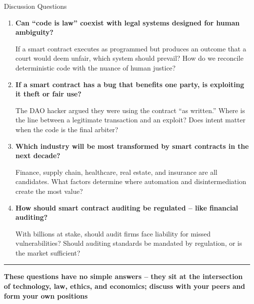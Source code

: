 \documentclass[8pt,aspectratio=169]{beamer}
\newcommand{\bottomnote}[1]{\vfill\vspace{-2mm}\textcolor{mllavender2}{\rule{\textwidth}{0.4pt}}\vspace{1mm}\footnotesize\textbf{#1}}
\begin{document}
\begin{frame}{Discussion Questions}
\begin{enumerate}
\item \textcolor{mlblue}{\textbf{Can ``code is law'' coexist with legal systems designed for human ambiguity?}}

\footnotesize If a smart contract executes as programmed but produces an outcome that a court would deem unfair, which system should prevail? How do we reconcile deterministic code with the nuance of human justice?

\normalsize
\vspace{3mm}
\item \textcolor{mlgreen}{\textbf{If a smart contract has a bug that benefits one party, is exploiting it theft or fair use?}}

\footnotesize The DAO hacker argued they were using the contract ``as written.'' Where is the line between a legitimate transaction and an exploit? Does intent matter when the code is the final arbiter?

\normalsize
\vspace{3mm}
\item \textcolor{mlorange}{\textbf{Which industry will be most transformed by smart contracts in the next decade?}}

\footnotesize Finance, supply chain, healthcare, real estate, and insurance are all candidates. What factors determine where automation and disintermediation create the most value?

\normalsize
\vspace{3mm}
\item \textcolor{mlpurple}{\textbf{How should smart contract auditing be regulated -- like financial auditing?}}

\footnotesize With billions at stake, should audit firms face liability for missed vulnerabilities? Should auditing standards be mandated by regulation, or is the market sufficient?
\end{enumerate}
\bottomnote{These questions have no simple answers -- they sit at the intersection of technology, law, ethics, and economics; discuss with your peers and form your own positions}
\end{frame}
\end{document}
